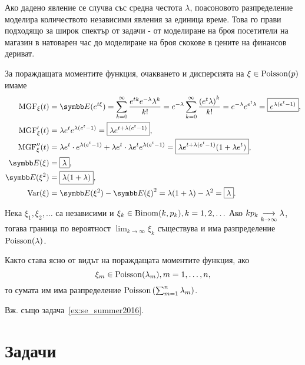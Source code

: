 \documentclass[numbers=endperiod, bibliography=totocnumbered]{scrartcl}
\begin{document}
Ако дадено явление се случва със средна честота \( \lambda \), поасоновото разпределение моделира количеството независими явления за единица време. Това го прави подходящо за широк спектър от задачи - от моделиране на броя посетители на магазин в натоварен час до моделиране на броя скокове в цените на финансов дериват.

За пораждащата моментите функция, очакването и дисперсията на \( \xi \in \DPoisson(p) \) имаме
\begingroup
\allowdisplaybreaks
\begin{align*}
  \MGF_\xi(t)
  &=
  \Expect(e^{t\xi})
  =
  \sum_{k=0}^\infty \frac{e^{tk} e^{-\lambda} \lambda^k} {k!}
  =
  e^{-\lambda} \sum_{k=0}^\infty \frac{{(e^t \lambda)}^k} {k!}
  =
  e^{-\lambda} e^{e^t \lambda}
  =
  \boxed{e^{\lambda (e^t - 1)}},
  \\
  \MGF'_\xi(t)
  &=
  \lambda e^t e^{\lambda (e^t - 1)}
  =
  \boxed{\lambda e^{t + \lambda (e^t - 1)}},
  \\
  \MGF''_\xi(t)
  &=
  \lambda e^t \cdot e^{\lambda (e^t - 1)} + \lambda e^t \cdot \lambda e^t e^{\lambda (e^t - 1)}
  =
  \boxed{\lambda e^{t + \lambda (e^t - 1)} (1 + \lambda e^t)},
  \\
  \Expect(\xi)
  &=
  \boxed{\lambda},
  \\
  \Expect(\xi^2)
  &=
  \boxed{\lambda(1 + \lambda)},
  \\
  \Var(\xi)
  &=
  \Expect(\xi^2) - {\Expect(\xi)}^2
  =
  \lambda(1 + \lambda) - \lambda^2
  =
  \boxed{\lambda}.
\end{align*}
\endgroup

\begin{theorem}[Поасон]\label{thm:poisson}
  Нека \( \xi_1, \xi_2, \ldots \) са независими и \( \xi_k \in \DBinomial(k, p_k), k = 1, 2, \ldots \) Ако \( k p_k \Conv[k \to \infty]{} \lambda \), тогава граница по вероятност \( \lim_{k \to \infty} \xi_k \) съществува и има разпределение \( \DPoisson(\lambda) \).
\end{theorem}

Както става ясно от видът на пораждащата моментите функция, ако
\begin{equation*}
  \xi_m \in \DPoisson(\lambda_m), m = 1, \ldots, n,
\end{equation*}
то сумата им има разпределение \( \DPoisson\left(\sum_{m=1}^n \lambda_m \right) \).

Вж. също задача~\ref{ex:se_summer2016}.

\section{Задачи}
\end{document}

